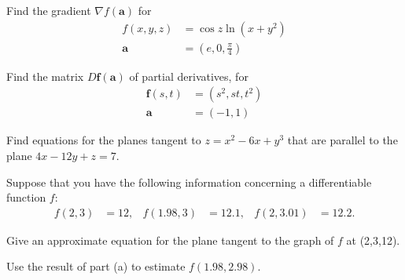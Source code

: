 \documentclass[oneperpage]{gsypset}
\begin{document}
	\begin{problem}[2.3.24]
		Find the gradient $\nabla f(\mathbf{a})$ for
		\begin{align*}
			f(x,y,z) &= \cos z \ln(x + y^2) \\
			\mathbf{a} &= \left(e,0,\frac{\pi}{4}\right)
		\end{align*}
	\end{problem}
	\begin{solution}
		
	\end{solution}
	
	\begin{problem}[2.3.33]
		Find the matrix $D\mathbf{f}(\mathbf{a})$ of partial derivatives, for
		\begin{align*}
			\mathbf{f}(s,t) &= (s^2, st, t^2) \\
			\mathbf{a} &= (-1,1)
		\end{align*}
	\end{problem}
	\begin{solution}
		
	\end{solution}
	
	\begin{problem}[2.3.40]
		Find equations for the planes tangent to $z= x^2 - 6x + y^3$
		that are parallel to the plane $4x - 12y + z = 7$.
	\end{problem}
	\begin{solution}
		
	\end{solution}
	
	\begin{problem}[2.3.42]
		Suppose that you have the following information concerning a differentiable function $f$:
		\begin{align*}
			f(2,3) &= 12, &
			f(1.98,3) &= 12.1, &
			f(2,3.01) &= 12.2.
		\end{align*}
		\begin{subproblems}[(a)]
			\subproblem Give an approximate equation for the plane tangent to the graph of $f$ at (2,3,12).
			\begin{solution}
				
			\end{solution}
			
			\subproblem Use the result of part (a) to estimate $f(1.98, 2.98)$.
			\begin{solution}
				
			\end{solution}
		\end{subproblems}
	\end{problem}
	
\end{document}
